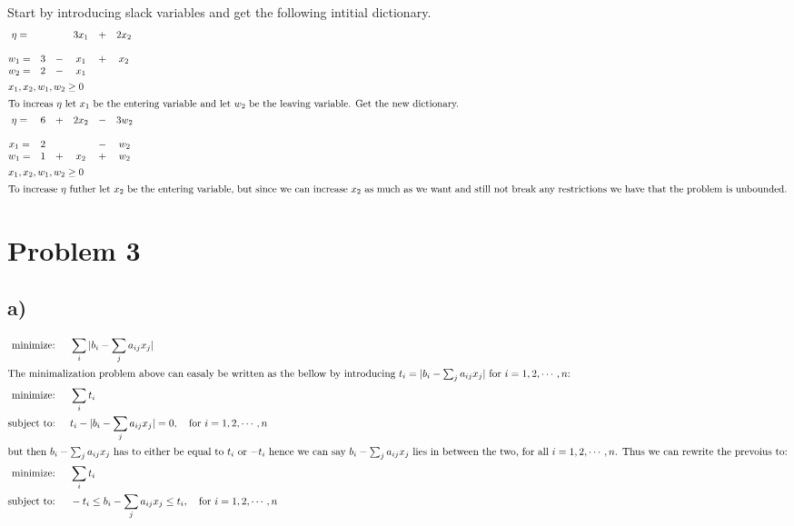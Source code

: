 \documentclass{article}
\begin{document}
Start by introducing slack variables and get the following intitial dictionary.
\begin{align*}
  &\begin{matrix}
     \eta = & & & 3x_1& + &2x_2 \\
     \\
     w_1 = & 3 & - & x_1& + &x_2  \\
     w_2 = & 2 & -&x_1 & & \\
   \end{matrix} \\
  &x_1, x_2, w_1, w_2 \geq 0 \\
  \intertext{To increas $\eta$ let $x_1$ be the entering variable and let $w_2$ be the leaving variable. Get the new dictionary.}
  &\begin{matrix}
     \eta = &6 & + & 2x_2& - &3w_2 \\
     \\
     x_1 = & 2 & & & -&w_2 \\
     w_1 = & 1 & + & x_2& + &w_2  \\
   \end{matrix} \\
  &x_1, x_2, w_1, w_2 \geq 0 \\
  \intertext{To increase $\eta$ futher let $x_2$ be the entering variable, but since we can increase $x_2$ as much as we want and still not break any restrictions we have that the problem is unbounded.}
\end{align*}


\section*{Problem 3}
\subsection*{a)}

\begin{align*}
  \text{minimize: \quad} &\sum_i|b_i - \sum_ja_{ij}x_j|\\
  \intertext{The minimalization problem above can easaly be written as the bellow by introducing $t_i = |b_i - \sum_ja_{ij}x_j|$ for $i = 1, 2, \cdots, n$:}
  \text{minimize: \quad} &\sum_i t_i \\
  \text{subject to: \quad} &t_i - |b_i - \sum_ja_{ij}x_j|  = 0, \text{\quad for $i = 1, 2, \cdots, n$}\\
  \intertext{but then $b_i - \sum_ja_{ij}x_j$ has to either be equal to $t_i$ or $-t_i$ hence we can say $b_i - \sum_ja_{ij}x_j$ lies in between the two, for all $i = 1, 2, \cdots, n$. Thus we can rewrite the prevoius to:}
  \text{minimize: \quad} &\sum_i t_i \\
  \text{subject to: \quad} &-t_i \leq b_i - \sum_ja_{ij}x_j \leq t_i, \text{\quad for $i = 1, 2, \cdots, n$}\\
\end{align*}
\end{document}

